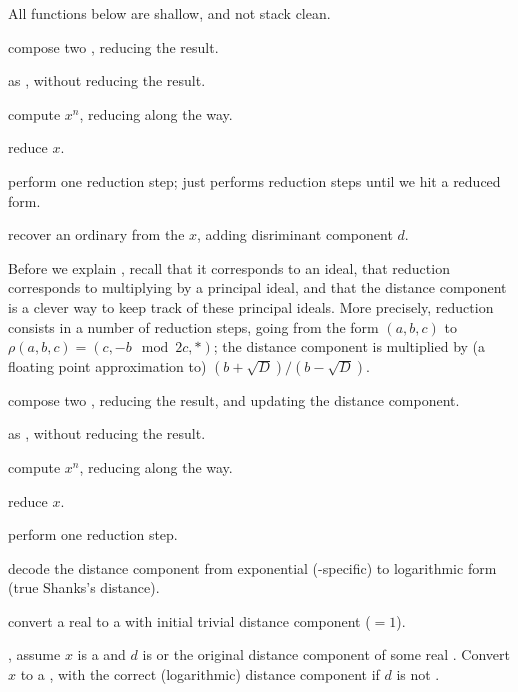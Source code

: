 \noindent All functions below are shallow, and not stack clean.

 compose two
, reducing the result.

as , without reducing the result.

 compute $x^n$, reducing
along the way.

 reduce $x$.

 perform one reduction step;
 just performs reduction steps until we hit a reduced form.

 recover an ordinary  from the
 $x$, adding disriminant component $d$.

Before we explain , recall that it corresponds to an ideal, that
reduction corresponds to multiplying by a principal ideal, and that the
distance component is a clever way to keep track of these principal ideals.
More precisely, reduction consists in a number of reduction steps,
going from the form $(a,b,c)$ to $\rho(a,b,c) = (c, -b \mod 2c, *)$;
the distance component is multiplied by (a floating point approximation to)
$(b + \sqrt{D}) / (b - \sqrt{D})$.

 compose two
, reducing the result, and updating the distance component.

as , without reducing the result.

 compute $x^n$, reducing
along the way.

 reduce $x$.

 perform one reduction step.

 decode the distance component
from exponential (-specific) to logarithmic form (true Shanks's
distance).

 convert a real  to a
 with initial trivial distance component ($= 1$).

, assume $x$ is a  and
$d$ is  or the original distance component of some real .
Convert $x$ to a , with the correct (logarithmic) distance component
if $d$ is not .

